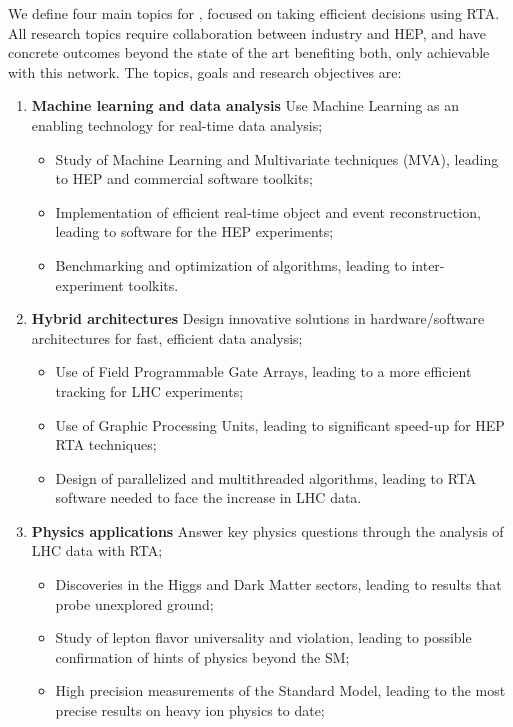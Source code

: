 \vskip2pt
We define four main topics for \acronym,
focused on taking efficient decisions using RTA. 
All research topics require collaboration between industry and HEP, 
and have concrete outcomes beyond the state of the art benefiting both, only achievable with this network. 
The \acronym topics, goals and research objectives are:

\begin{enumerate}%

\item\textbf{Machine learning and data analysis} Use Machine Learning as an enabling technology for real-time data analysis;
\begin{itemize}
\item Study of Machine Learning and Multivariate techniques (MVA), leading to HEP and commercial software toolkits; 
\item Implementation of efficient real-time object and event reconstruction, leading to software for the HEP experiments;
\item Benchmarking and optimization of algorithms, leading to inter-experiment toolkits. 
\end{itemize}

\item\textbf{Hybrid architectures} Design innovative solutions in hardware/software architectures for fast, efficient data analysis;
\begin{itemize}
\item Use of Field Programmable Gate Arrays, leading to a more efficient tracking for LHC experiments;%
\item Use of Graphic Processing Units, leading to significant speed-up for HEP RTA techniques;
\item Design of parallelized and multithreaded algorithms, leading to RTA software needed to face the increase in LHC data.
\end{itemize}

\item\textbf{Physics applications} Answer key physics questions through the analysis of LHC data with RTA;
\begin{itemize}
\item Discoveries in the Higgs and Dark Matter sectors, leading to results that probe unexplored ground;
\item Study of lepton flavor universality and violation, leading to possible confirmation of hints of physics beyond the SM;
\item High precision measurements of the Standard Model, leading to the most precise results on heavy ion physics to date;
\end{itemize}


\end{enumerate}
